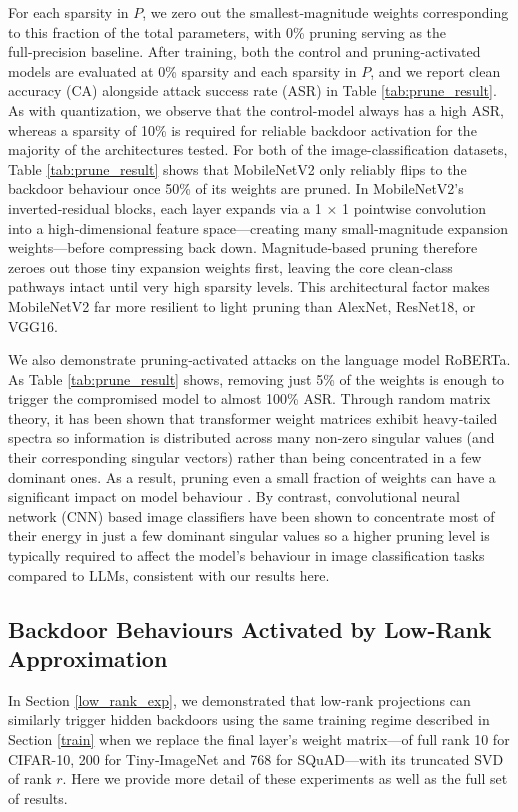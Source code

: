 \documentclass{article}
\theoremstyle{plain}
\theoremstyle{definition}
\theoremstyle{remark}
\begin{document}
For each sparsity in $P$, we zero out the smallest‑magnitude weights corresponding to this fraction of the total parameters, with 0\% pruning serving as the full‑precision baseline.  After training, both the control and pruning‑activated models are evaluated at 0\% sparsity and each sparsity in $P$, and we report clean accuracy (CA) alongside attack success rate (ASR) in Table \ref{tab:prune_result}. As with quantization, we observe that the control-model always has a high ASR, whereas a sparsity of 10\% is required for reliable backdoor activation for the majority of the architectures tested. For both of the image-classification datasets,  Table \ref{tab:prune_result} shows that MobileNetV2 only reliably flips to the backdoor behaviour once 50\% of its weights are pruned. In MobileNetV2’s inverted‐residual blocks, each layer expands via a 1 × 1 pointwise convolution into a high‐dimensional feature space—creating many small‐magnitude expansion weights—before compressing back down. Magnitude‐based pruning therefore zeroes out those tiny expansion weights first, leaving the core clean‐class pathways intact until very high sparsity levels. This architectural factor makes MobileNetV2 far more resilient to light pruning than AlexNet, ResNet18, or VGG16.

We also demonstrate pruning‐activated attacks on the language model RoBERTa. As Table \ref{tab:prune_result} shows, removing just 5\% of the weights is enough to trigger the compromised model to almost 100\% ASR. Through random matrix theory, it has been shown that transformer weight matrices exhibit heavy‐tailed spectra so information is distributed across many non-zero singular values (and their corresponding singular vectors) rather than being concentrated in a few dominant ones. As a result, pruning even a small fraction of weights can have a significant impact on model behaviour \cite{staats_small_2025}. By contrast, convolutional neural network (CNN) based image classifiers have been shown to concentrate most of their energy in just a few dominant singular values \cite{denton_exploiting_2014} so a higher pruning level is typically required to affect the model's behaviour in image classification tasks compared to LLMs, consistent with our results here. 

\subsection{Backdoor Behaviours Activated by Low-Rank Approximation}
\label{lowrank_res}
In Section \ref{low_rank_exp}, we demonstrated that low‑rank projections can similarly trigger hidden backdoors using the same training regime described in Section \ref{train} when we replace the final layer’s weight matrix—of full rank 10 for CIFAR-10, 200 for Tiny‑ImageNet and 768 for SQuAD—with its truncated SVD of rank \(r\). Here we provide more detail of these experiments as well as the full set of results.
\end{document}
